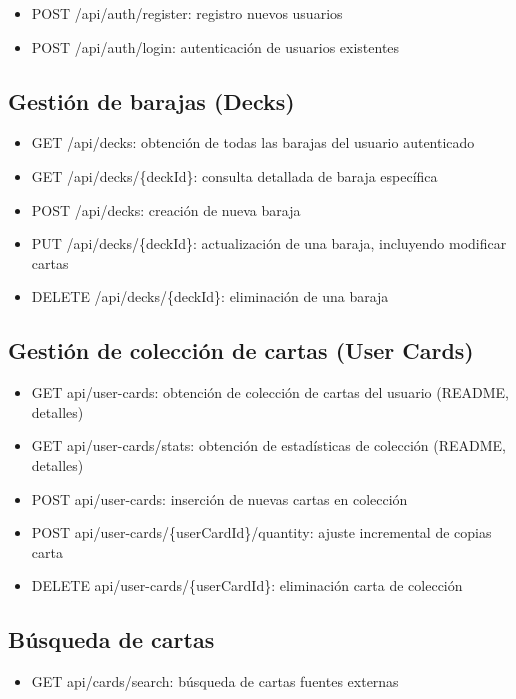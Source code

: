 \begin{itemize}
    \item POST /api/auth/register: registro nuevos usuarios
    \item POST /api/auth/login: autenticación de usuarios existentes
\end{itemize}

\subsection*{Gestión de barajas (Decks)}

\begin{itemize}
    \item GET /api/decks: obtención de todas las barajas del usuario autenticado
    \item GET /api/decks/\{deckId\}: consulta detallada de baraja específica
    \item POST /api/decks: creación de nueva baraja
    \item PUT /api/decks/\{deckId\}: actualización de una baraja, incluyendo modificar cartas
    \item DELETE /api/decks/\{deckId\}: eliminación de una baraja
\end{itemize}

\subsection*{Gestión de colección de cartas (User Cards)}

\begin{itemize}
    \item GET api/user-cards: obtención de colección de cartas del usuario (README, detalles)
    \item GET api/user-cards/stats: obtención de estadísticas de colección (README, detalles)
    \item POST api/user-cards: inserción de nuevas cartas en colección
    \item POST api/user-cards/\{userCardId\}/quantity: ajuste incremental de copias carta
    \item DELETE api/user-cards/\{userCardId\}: eliminación carta de colección 
\end{itemize}

\subsection*{Búsqueda de cartas}

\begin{itemize}
    \item GET api/cards/search: búsqueda de cartas fuentes externas \cite{tcgdexApi,scryfallApi,ygoprodeckApi}
\end{itemize}

